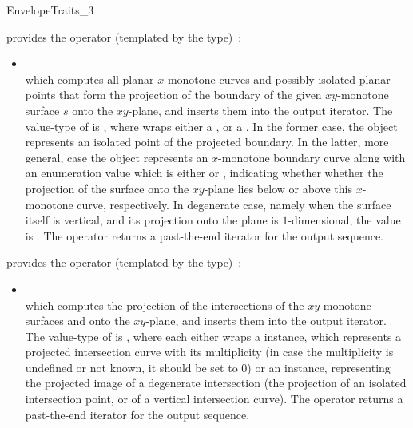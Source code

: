 \begin{ccRefConcept}{EnvelopeTraits_3}
{provides the operator (templated by the  type)~:
 \begin{itemize}
 \item {} \\
 which computes all planar $x$-monotone curves and possibly isolated planar 
 points that form the projection of the boundary of the given $xy$-monotone 
 surface $s$ onto the $xy$-plane, and inserts them into the output iterator. 
 The value-type of  is , where 
 wraps either a , or a
 . In the former case, the
 object represents an isolated point of the projected boundary. In the latter,
 more general, case the object represents an $x$-monotone boundary curve
 along with an enumeration value which is either 
 or , indicating whether whether the projection of the
 surface onto the $xy$-plane lies below or above this $x$-monotone curve,
 respectively. In degenerate case, namely when the surface itself is vertical,
 and its projection onto the plane is $1$-dimensional, the 
 value is . The operator returns a past-the-end
 iterator for the output sequence.
 \end{itemize}}
 
{provides the operator (templated by the  type)~:
 \begin{itemize}
 \item {} \\
 which computes the projection of the intersections of the
 $xy$-monotone surfaces  and  onto the $xy$-plane,
 and inserts them into the output iterator.
 The value-type of  is , where
 each  either wraps a 
 instance, which represents a projected intersection curve with its
 multiplicity (in case the multiplicity is undefined or not known, it
 should be set to $0$) or an  instance, representing the
 projected image of a degenerate intersection (the projection of an
 isolated intersection point, or of a vertical intersection curve).
 The operator returns a past-the-end iterator for the output sequence.
 \end{itemize}}


\end{ccRefConcept}
